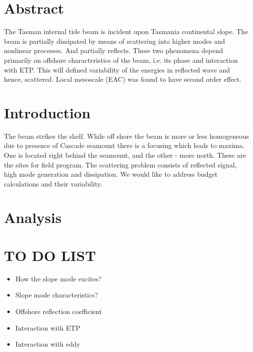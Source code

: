 \section{Abstract}
The Tasman internal tide beam is incident upon Tasmania continental slope. The beam is partially dissipated by means of scattering into higher modes and nonlinear processes. And partially reflects. These two phenomena depend primarily on offshore characteristics of the beam, i.e. its phase and interaction with ETP. This will defined variability of the energies in reflected wave and hence, scattered. Local mesoscale (EAC) was found to have second order effect.

\section{Introduction}
The beam strikes the shelf. While off shore the beam is more or less homogeneous due to presence of Cascade seamount there is a focusing which leads to maxima. One is located right behind the seamount, and the other - more north. These are the sites for field program. The scattering problem consists of reflected signal, high mode generation and dissipation. We would like to address budget calculations and their variability.

\section{Analysis}

\newpage
\section*{TO DO LIST}
\begin{itemize}
\item How the slope mode excites?
\item Slope mode characteristics?
\item Offshore reflection coefficient
\item Interaction with ETP
\item Interaction with eddy
\end{itemize}





